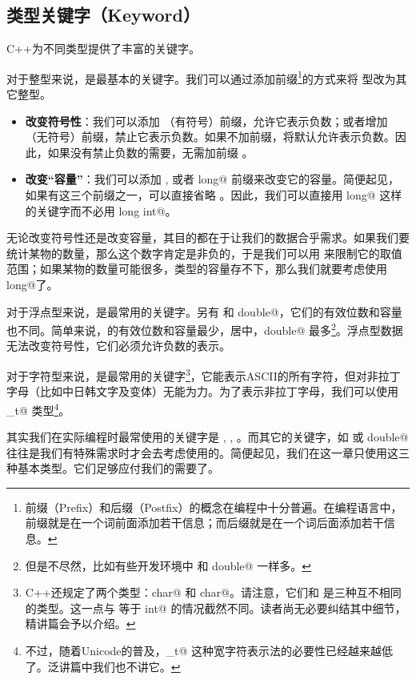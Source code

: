 \subsection*{类型关键字（Keyword）}
C++为不同类型提供了丰富的关键字。\par
对于整型来说，\lstinline@int@ 是最基本的关键字。我们可以通过添加前缀\footnote{前缀（Prefix）和后缀（Postfix）的概念在编程中十分普遍。在编程语言中，前缀就是在一个词前面添加若干信息；而后缀就是在一个词后面添加若干信息。}的方式来将 \lstinline@int@ 型改为其它整型。\par
\begin{itemize}
    \item \textbf{改变符号性}：我们可以添加 \lstinline@signed@（有符号）前缀，允许它表示负数；或者增加 \lstinline@unsigned@（无符号）前缀，禁止它表示负数。如果不加前缀，将默认允许表示负数。因此，如果没有禁止负数的需要，无需加前缀 \lstinline@unsigned@。
    \item \textbf{改变``容量''}：我们可以添加 \lstinline@short@, \lstinline@long@ 或者 \lstinline@long long@ 前缀来改变它的容量。简便起见，如果有这三个前缀之一，可以直接省略 \lstinline@int@。因此，我们可以直接用 \lstinline@long long@ 这样的关键字而不必用 \lstinline@long long int@。
\end{itemize}\par
无论改变符号性还是改变容量，其目的都在于让我们的数据合乎需求。如果我们要统计某物的数量，那么这个数字肯定是非负的，于是我们可以用 \lstinline@unsigned@ 来限制它的取值范围；如果某物的数量可能很多，\lstinline@int@ 类型的容量存不下，那么我们就要考虑使用 \lstinline@long long@了。\par
对于浮点型来说，\lstinline@double@ 是最常用的关键字。另有 \lstinline@float@ 和 \lstinline@long double@，它们的有效位数和容量也不同。简单来说，\lstinline@float@ 的有效位数和容量最少，\lstinline@double@ 居中，\lstinline@long double@ 最多\footnote{但是不尽然，比如有些开发环境中 \lstinline@double@ 和 \lstinline@long double@ 一样多。}。浮点型数据无法改变符号性，它们必须允许负数的表示。\par
对于字符型来说，\lstinline@char@ 是最常用的关键字\footnote{C++还规定了两个类型：\lstinline@signed char@ 和 \lstinline@unsigned char@。请注意，它们和 \lstinline@char@ 是三种互不相同的类型。这一点与 \lstinline@int@ 等于 \lstinline@signed int@ 的情况截然不同。读者尚无必要纠结其中细节，精讲篇会予以介绍。}，它能表示ASCII的所有字符，但对非拉丁字母（比如中日韩文字及变体）无能为力。为了表示非拉丁字母，我们可以使用 \lstinline@wchar_t@ 类型\footnote{不过，随着Unicode的普及，\lstinline@wchar_t@ 这种宽字符表示法的必要性已经越来越低了。泛讲篇中我们也不讲它。}。\par
其实我们在实际编程时最常使用的关键字是 \lstinline@int@, \lstinline@double@, \lstinline@char@。而其它的关键字，如 \lstinline@unsigned@ 或 \lstinline@long double@ 往往是我们有特殊需求时才会去考虑使用的。简便起见，我们在这一章只使用这三种基本类型。它们足够应付我们的需要了。\par
